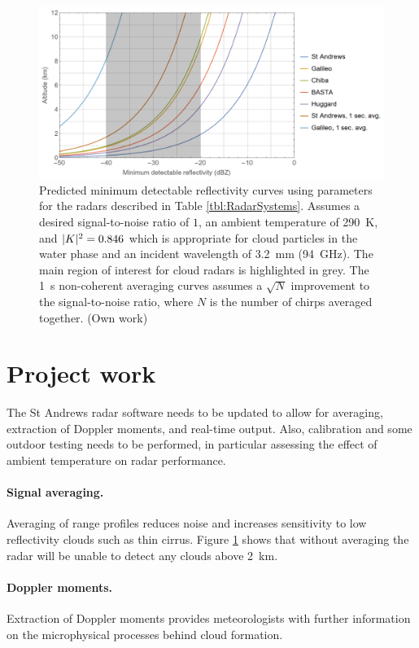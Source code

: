 \documentclass{article}
\DeclarePairedDelimiter\abs{\lvert}{\rvert}%
\begin{document}
\begin{figure}
	\centering
	\includegraphics[width=\textwidth]{sensitivity-2}
	\caption{Predicted minimum detectable reflectivity curves using parameters for the radars described in Table \ref{tbl:RadarSystems}. Assumes a desired signal-to-noise ratio of \(1\), an ambient temperature of \SI{290}{\kelvin}, and \(\abs{K}^2 = 0.846\) which is appropriate for cloud particles in the water phase and an incident wavelength of \SI{3.2}{\milli\metre} (\SI{94}{\giga\hertz}).\supercite{ComplexIndexOfRefraction} The main region of interest for cloud radars is highlighted in grey. The \SI{1}{\second} non-coherent averaging curves assumes a \(\sqrt{N}\) improvement to the signal-to-noise ratio, where \(N\) is the number of chirps averaged together. (Own work)}
	\label{fig:Sensitivity}
\end{figure}

\section{Project work}
The St Andrews radar software needs to be updated to allow for averaging, extraction of Doppler moments, and real-time output. Also, calibration and some outdoor testing needs to be performed, in particular assessing the effect of ambient temperature on radar performance.
\paragraph{Signal averaging.} Averaging of range profiles reduces noise and increases sensitivity to low reflectivity clouds such as thin cirrus. Figure \ref{fig:Sensitivity} shows that without averaging the radar will be unable to detect any clouds above \SI{2}{\kilo\metre}.
\paragraph{Doppler moments.} Extraction of Doppler moments provides meteorologists with further information on the microphysical processes behind cloud formation.
\end{document}
